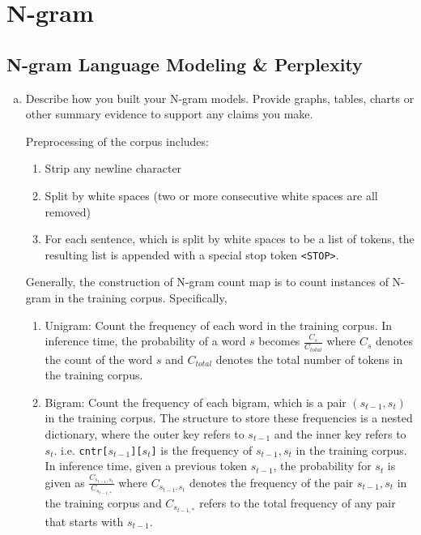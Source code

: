 \documentclass{article}
\newenvironment{solution}{\color{blue}}{}
\begin{document}
\section{N-gram}
\subsection{N-gram Language Modeling \& Perplexity}
\begin{enumerate}[(a)]
  \item Describe how you built your N-gram models. Provide graphs, tables, charts or other summary evidence to support any claims you make.

  \begin{solution}
    Preprocessing of the corpus includes: 
    \begin{enumerate}[1.]
      \item Strip any newline character
      \item Split by white spaces (two or more consecutive white spaces are all removed)
      \item For each sentence, which is split by white spaces to be a list of tokens, 
      the resulting list is appended with a special stop token \texttt{<STOP>}.
    \end{enumerate}
    Generally, the construction of N-gram count map is to count instances of N-gram in the training
    corpus. Specifically, 
    \begin{enumerate}[1.]
      \item Unigram: Count the frequency of each word in the training corpus. In inference time, 
      the probability of a word $s$ becomes $\frac{C_s}{C_{total}}$ where $C_s$ denotes the count 
      of the word $s$ and $C_{total}$ denotes the total number of tokens in the training corpus.
      \item Bigram: Count the frequency of each bigram, which is a pair $(s_{t-1}, s_t)$ in the 
      training corpus. The structure to store these frequencies is a nested dictionary, where
      the outer key refers to $s_{t-1}$ and the inner key refers to $s_t$. i.e. 
      \texttt{cntr[$s_{t-1}$][$s_{t}$]} is the frequency of $s_{t-1}, s_t$ in the training
      corpus. In inference time, given a previous token $s_{t-1}$, the probability for $s_{t}$
      is given as $\frac{C_{s_{t-1}, s_{t}}}{C_{s_{t-1, \ast}}}$ where $C_{s_{t-1}, s_{t}}$ 
      denotes the frequency of the pair $s_{t-1}, s_{t}$ in the training corpus and 
      $C_{s_{t-1, \ast}}$ refers to the total frequency of any pair that starts with $s_{t-1}$.

\end{enumerate}
\end{solution}
\end{enumerate}
\end{document}
